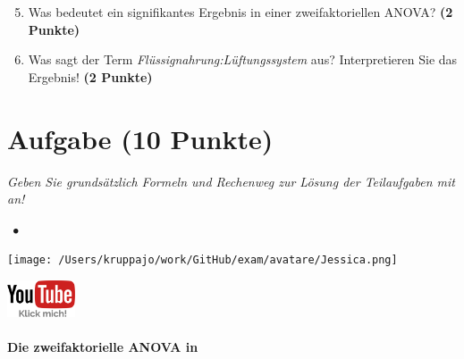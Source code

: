 \documentclass[a4paper, 9pt]{scrartcl}\usepackage[]{graphicx}\usepackage[]{xcolor}
\begin{document}
\begin{enumerate}
  \setcounter{enumi}{4}
\item Was bedeutet ein signifikantes Ergebnis in einer zweifaktoriellen ANOVA? \textbf{(2 Punkte)}
\item Was sagt der Term \textit{Flüssignahrung:Lüftungssystem} aus? Interpretieren Sie das Ergebnis! \textbf{(2 Punkte)}
\end{enumerate}
 
\clearpage

\section{Aufgabe \hfill (10 Punkte)}

\textit{Geben Sie grundsätzlich Formeln und Rechenweg zur Lösung der Teilaufgaben mit an!} \\[1Ex]
 

 
\ifcollection
\begin{flushright}
\tiny\vspace{-3Ex}
\textbf{\examinhaltstart}
\exammodulestatversuch $\;\bullet$
\exammodulebiostat
\vspace{-4Ex}
\end{flushright}
\begin{minipage}[t]{0.5\textwidth}
\texttt{[image: /Users/kruppajo/work/GitHub/exam/avatare/Jessica.png]}
\end{minipage}
\begin{minipage}[t]{0.5\textwidth}
\hfill
\href{https://youtu.be/rWTyHXXlYjY}{\includegraphics[width = 2cm]{img/youtube}}
\end{minipage}
\vspace{-3Ex}
\fi



\ifcollection
\paragraph{Die zweifaktorielle ANOVA in \Rlogo}
\fi
\end{document}
